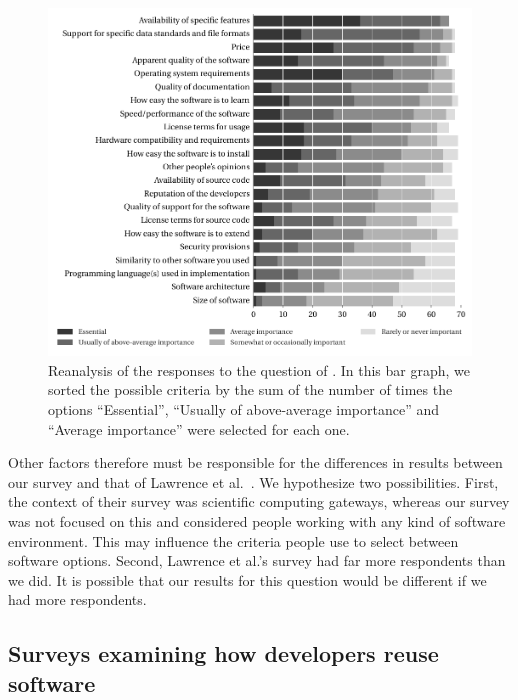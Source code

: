\documentclass{casicswhitepaper}
\begin{document}
\begin{figure}[t]
  \vspace*{1ex}
  \centering
  \hspace*{-1ex}%
  \includegraphics{files/plots/bar-graph-criteria-ready-to-run-reranked.pdf}
  \vspace*{-4ex}
  \caption{Reanalysis of the responses to the question of \protect{}.  In this bar graph, we sorted the possible criteria by the sum of the number of times the options ``Essential'', ``Usually of above-average importance'' and ``Average importance'' were selected for each one.}
  \label{criteria-ready-to-run-reranked}
\end{figure}

Other factors therefore must be responsible for the differences in results between our survey and that of Lawrence et al.~\cite{lawrence2015science}.  We hypothesize two possibilities.  First, the context of their survey was scientific computing gateways, whereas our survey was not focused on this and considered people working with any kind of software environment.  This may influence the criteria people use to select between software options.  Second, Lawrence et al.'s survey had far more respondents than we did.  It is possible that our results for this question would be different if we had more respondents.


\subsection{Surveys examining how developers reuse software}
\end{document}
